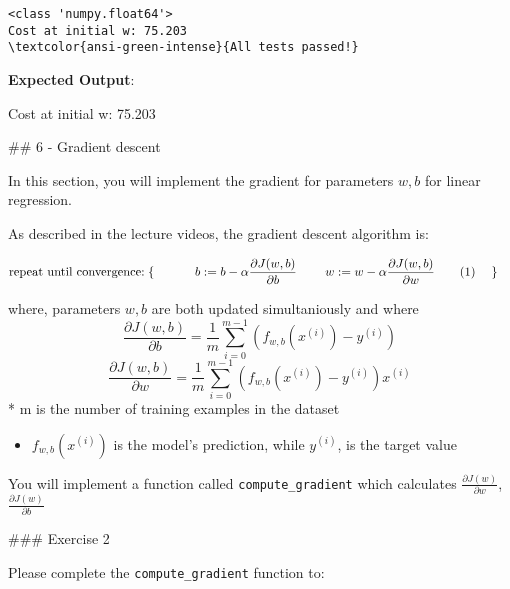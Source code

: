 \documentclass[11pt]{article}
\providecommand{\tightlist}{%
      \setlength{\itemsep}{0pt}\setlength{\parskip}{0pt}}
\begin{document}
    \begin{Verbatim}[commandchars=\\\{\}]
<class 'numpy.float64'>
Cost at initial w: 75.203
\textcolor{ansi-green-intense}{All tests passed!}
    \end{Verbatim}

    \textbf{Expected Output}:

Cost at initial w: 75.203

    \#\# 6 - Gradient descent

In this section, you will implement the gradient for parameters \(w, b\)
for linear regression.

    As described in the lecture videos, the gradient descent algorithm is:

\[\begin{align*}& \text{repeat until convergence:} \; \lbrace \newline \; & \phantom {0000} b := b -  \alpha \frac{\partial J(w,b)}{\partial b} \newline       \; & \phantom {0000} w := w -  \alpha \frac{\partial J(w,b)}{\partial w} \tag{1}  \; & 
\newline & \rbrace\end{align*}\]

where, parameters \(w, b\) are both updated simultaniously and where\\
\[
\frac{\partial J(w,b)}{\partial b}  = \frac{1}{m} \sum\limits_{i = 0}^{m-1} (f_{w,b}(x^{(i)}) - y^{(i)}) \tag{2}
\] \[
\frac{\partial J(w,b)}{\partial w}  = \frac{1}{m} \sum\limits_{i = 0}^{m-1} (f_{w,b}(x^{(i)}) -y^{(i)})x^{(i)} \tag{3}
\] * m is the number of training examples in the dataset

\begin{itemize}
\tightlist
\item
  \(f_{w,b}(x^{(i)})\) is the model's prediction, while \(y^{(i)}\), is
  the target value
\end{itemize}

You will implement a function called \texttt{compute\_gradient} which
calculates \(\frac{\partial J(w)}{\partial w}\),
\(\frac{\partial J(w)}{\partial b}\)

    \#\#\# Exercise 2

Please complete the \texttt{compute\_gradient} function to:
\end{document}

